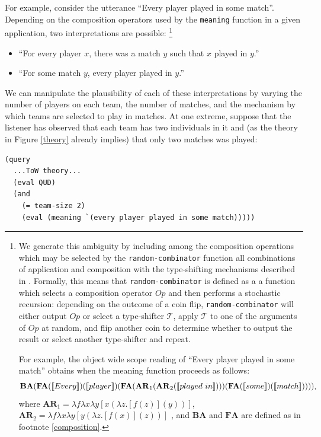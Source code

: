 \documentclass[12pt]{article}
\newcommand{\llbracket}{\ensuremath{\left [\!\left [}}%
\newcommand{\rrbracket}{\ensuremath{\right ]\!\right ]}}
\providecommand{\sv}[1]{\ensuremath{\llbracket #1 \rrbracket}}
\begin{document}
For example, consider the utterance ``Every player played in some match''. 
Depending on the composition operators used by the \lstinline{meaning} function in a given application, two interpretations are possible:
\footnote{
We generate this ambiguity by including among the composition operations which may be selected by the \lstinline{random-combinator} function all combinations of application and composition with the type-shifting mechanisms described in \citet{hendriks93,barker05}.
Formally, this means that \lstinline{random-combinator} is defined as a a function which selects a composition operator $\mathit{Op}$ and then performs a stochastic recursion: depending on the outcome of a coin flip, \lstinline{random-combinator} will either output $\mathit{Op}$ or select a type-shifter $\mathcal{T}$, apply $\mathcal{T}$ to one of the arguments of $\mathit{Op}$ at random, and flip another coin to determine whether to output the result or select another type-shifter and repeat.

For example, the object wide scope reading of ``Every player played in some match'' obtains when the meaning function proceeds as follows: 
$$
\mathbf{BA}(\mathbf{FA}(\sv{Every})(\sv{player})
(\mathbf{FA}(\mathbf{AR}_1(\mathbf{AR}_2(\sv{played\ in})))
(\mathbf{FA}(\sv{some})(\sv{match})))),
$$  
where $\mathbf{AR}_1 = \lambda f \lambda x \lambda y [x(\lambda z . [f(z)] (y))]$, $\mathbf{AR}_2 = \lambda f \lambda x \lambda y [y(\lambda z . [f(x)] (z))]$ \cite[cf.][pp.453ff.]{barker05}, and $\mathbf{BA}$ and $\mathbf{FA}$ are defined as in footnote \ref{composition}.
}
\begin{itemize}
\item ``For every player $x$, there was a match $y$ such that $x$ played in $y$.'' 
\item ``For some match $y$, every player played in $y$.''
\end{itemize}
We can manipulate the plausibility of each of these interpretations by varying the number of players on each team, the number of matches, and the mechanism by which teams are selected to play in matches. 
At one extreme, suppose that the listener has observed that each team has two individuals in it and  (as the theory in Figure \ref{theory} already implies) that only two matches was played:
\begin{lstlisting}
(query
  ...ToW theory...
  (eval QUD)
  (and 
    (= team-size 2)
    (eval (meaning `(every player played in some match)))))
\end{lstlisting}
\end{document}
